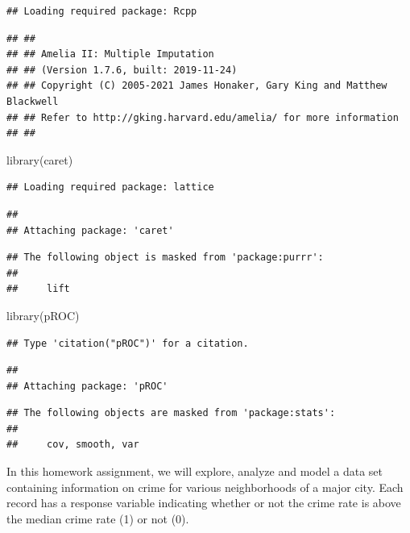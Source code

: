 \documentclass[
]{article}
\newenvironment{Shaded}{\begin{snugshade}}{\end{snugshade}}
\newcommand{\FunctionTok}[1]{\textcolor[rgb]{0.00,0.00,0.00}{#1}}
\newcommand{\NormalTok}[1]{#1}
\begin{document}
\begin{verbatim}
## Loading required package: Rcpp
\end{verbatim}

\begin{verbatim}
## ## 
## ## Amelia II: Multiple Imputation
## ## (Version 1.7.6, built: 2019-11-24)
## ## Copyright (C) 2005-2021 James Honaker, Gary King and Matthew Blackwell
## ## Refer to http://gking.harvard.edu/amelia/ for more information
## ##
\end{verbatim}

\begin{Shaded}
\begin{Highlighting}[]
\FunctionTok{library}\NormalTok{(caret)}
\end{Highlighting}
\end{Shaded}

\begin{verbatim}
## Loading required package: lattice
\end{verbatim}

\begin{verbatim}
## 
## Attaching package: 'caret'
\end{verbatim}

\begin{verbatim}
## The following object is masked from 'package:purrr':
## 
##     lift
\end{verbatim}

\begin{Shaded}
\begin{Highlighting}[]
\FunctionTok{library}\NormalTok{(pROC)}
\end{Highlighting}
\end{Shaded}

\begin{verbatim}
## Type 'citation("pROC")' for a citation.
\end{verbatim}

\begin{verbatim}
## 
## Attaching package: 'pROC'
\end{verbatim}

\begin{verbatim}
## The following objects are masked from 'package:stats':
## 
##     cov, smooth, var
\end{verbatim}

In this homework assignment, we will explore, analyze and model a data
set containing information on crime for various neighborhoods of a major
city. Each record has a response variable indicating whether or not the
crime rate is above the median crime rate (1) or not (0).
\end{document}
